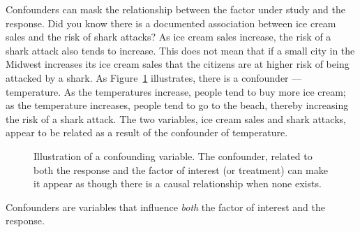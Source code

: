 \documentclass[
  letterpaper,
  DIV=11,
  numbers=noendperiod]{scrreprt}
\theoremstyle{definition}
\theoremstyle{definition}
\theoremstyle{plain}
\theoremstyle{remark}
\begin{document}
Confounders can mask the relationship between the factor under study and
the response. Did you know there is a documented association between ice
cream sales and the risk of shark attacks? As ice cream sales increase,
the risk of a shark attack also tends to increase. This does not mean
that if a small city in the Midwest increases its ice cream sales that
the citizens are at higher risk of being attacked by a shark. As
Figure~\ref{fig-data-confounding} illustrates, there is a confounder ---
temperature. As the temperatures increase, people tend to buy more ice
cream; as the temperature increases, people tend to go to the beach,
thereby increasing the risk of a shark attack. The two variables, ice
cream sales and shark attacks, appear to be related as a result of the
confounder of temperature.

\begin{figure}


\caption{\label{fig-data-confounding}Illustration of a confounding
variable. The confounder, related to both the response and the factor of
interest (or treatment) can make it appear as though there is a causal
relationship when none exists.}

\end{figure}%

\begin{tcolorbox}[enhanced jigsaw, colbacktitle=quarto-callout-tip-color!10!white, colback=white, left=2mm, title=\textcolor{quarto-callout-tip-color}{\faLightbulb}\hspace{0.5em}{Big Idea}, toptitle=1mm, leftrule=.75mm, breakable, bottomrule=.15mm, arc=.35mm, rightrule=.15mm, toprule=.15mm, coltitle=black, opacityback=0, colframe=quarto-callout-tip-color-frame, opacitybacktitle=0.6, bottomtitle=1mm, titlerule=0mm]

Confounders are variables that influence \emph{both} the factor of
interest and the response.

\end{tcolorbox}
\end{document}
